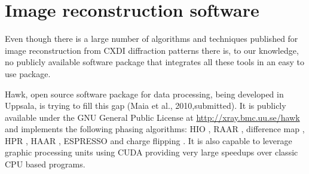 \section{Image reconstruction software}

Even though there is a large number of algorithms and techniques published for
image reconstruction from CXDI diffraction patterns there is, to our knowledge, no publicly available
software package that integrates all these tools in an easy to use package.

Hawk, open source software package for data processing, being developed in Uppsala, is trying to fill
this gap (Maia et al., 2010,submitted). It is publicly available under the GNU General Public License at
\url{http://xray.bmc.uu.se/hawk}  and implements the following phasing algorithms:
 HIO \cite{Fienup1982Phase}, RAAR \cite{Luke2005Relaxed}, difference map
 \cite{Elser2003Phase}, HPR \cite{Bauschke2003Hybrid}, HAAR \cite{Bauschke2006Strongly}, ESPRESSO
\cite{Marchesini2008Ab} and charge flipping
\cite{Oszlanyi2004Ab,Oszlanyi2005It}. It is also
capable to leverage graphic processing units using CUDA providing very large speedups over classic
CPU based programs.

